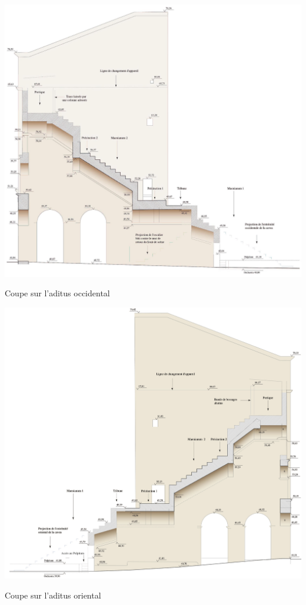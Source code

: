 \begin{figureth}
	\begin{subfigureth}{0.49\textwidth}
		\includegraphics[width=\linewidth]{images/aditusOccidental}
		\caption[Coupe sur l'\gls{aditus} occidental]{Coupe sur l'\gls{aditus} occidental \cite[Pl. XLVIII]{orangePl}}
		\label{aditusOccidental}
	\end{subfigureth}	
	\begin{subfigureth}{0.49\textwidth}
		\includegraphics[width=\linewidth]{images/aditusOriental}
		\caption[Coupe sur l'\gls{aditus} oriental]{Coupe sur l'\gls{aditus} oriental \cite[Pl. XLIX]{orangePl}}
		\label{aditusOriental}
	\end{subfigureth}
	\label{aditus}
\end{figureth}

